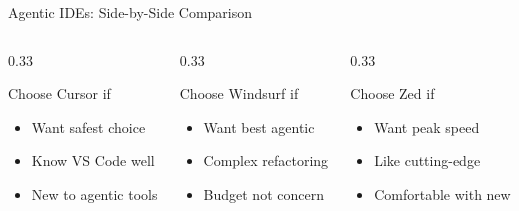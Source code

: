 \documentclass[aspectratio=169,11pt]{beamer}
\begin{document}
\begin{frame}{Agentic IDEs: Side-by-Side Comparison}
    \vspace{0.3cm}
    \begin{columns}[T]
        \begin{column}{0.33\textwidth}
            \begin{block}{Choose Cursor if}
                \begin{itemize}
                    \item Want safest choice
                    \item Know VS Code well
                    \item New to agentic tools
                \end{itemize}
            \end{block}
        \end{column}
        \begin{column}{0.33\textwidth}
            \begin{block}{Choose Windsurf if}
                \begin{itemize}
                    \item Want best agentic
                    \item Complex refactoring
                    \item Budget not concern
                \end{itemize}
            \end{block}
        \end{column}
        \begin{column}{0.33\textwidth}
            \begin{block}{Choose Zed if}
                \begin{itemize}
                    \item Want peak speed
                    \item Like cutting-edge
                    \item Comfortable with new
                \end{itemize}
            \end{block}
        \end{column}
    \end{columns}

\end{frame}

\end{document}
